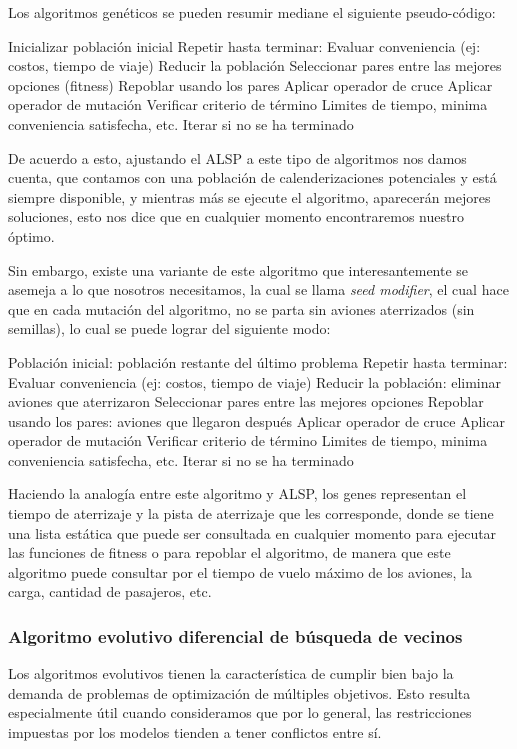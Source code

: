 \documentclass[letter, 11pt]{article}
\begin{document}
Los algoritmos genéticos se pueden resumir mediane el siguiente pseudo-código:

\begin{verbatimtab}[4]
Inicializar población inicial
Repetir hasta terminar:
	Evaluar conveniencia (ej: costos, tiempo de viaje)
	Reducir la población
	Seleccionar pares entre las mejores opciones (fitness)
	Repoblar usando los pares
		Aplicar operador de cruce
		Aplicar operador de mutación
	Verificar criterio de término
		Limites de tiempo, minima conveniencia satisfecha, etc.
		Iterar si no se ha terminado
\end{verbatimtab}

De acuerdo a esto, ajustando el ALSP a este tipo de algoritmos nos damos cuenta, que contamos con una población de calenderizaciones potenciales y está siempre disponible, y mientras más se ejecute el algoritmo, aparecerán mejores soluciones, esto nos dice que en cualquier momento encontraremos nuestro óptimo.

Sin embargo, existe una variante de este algoritmo que interesantemente se asemeja a lo que nosotros necesitamos, la cual se llama \textit{seed modifier}, el cual hace que en cada mutación del algoritmo, no se parta sin aviones aterrizados (sin semillas), lo cual se puede lograr del siguiente modo:

\begin{verbatimtab}[4]
Población inicial: población restante del último problema
Repetir hasta terminar:
	Evaluar conveniencia (ej: costos, tiempo de viaje)
	Reducir la población: eliminar aviones que aterrizaron
	Seleccionar pares entre las mejores opciones
	Repoblar usando los pares: aviones que llegaron después
		Aplicar operador de cruce
		Aplicar operador de mutación
	Verificar criterio de término
		Limites de tiempo, minima conveniencia satisfecha, etc.
		Iterar si no se ha terminado
\end{verbatimtab}

Haciendo la analogía entre este algoritmo y ALSP, los genes representan el tiempo de aterrizaje y la pista de aterrizaje que les corresponde, donde se tiene una lista estática que puede ser consultada en cualquier momento para ejecutar las funciones de fitness o para repoblar el algoritmo, de manera que este algoritmo puede consultar por el tiempo de vuelo máximo de los aviones, la carga, cantidad de pasajeros, etc.

\subsubsection{Algoritmo evolutivo diferencial de búsqueda de vecinos}
Los algoritmos evolutivos tienen la característica de cumplir bien bajo la demanda de problemas de optimización de múltiples objetivos. Esto resulta especialmente útil cuando consideramos que por lo general, las restricciones impuestas por los modelos tienden a tener conflictos entre sí.
\end{document}
